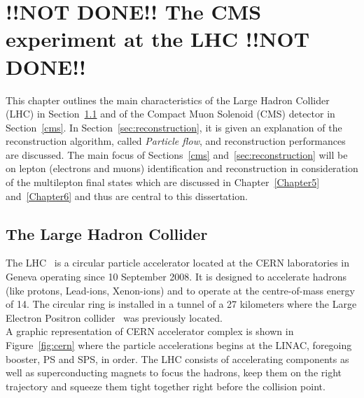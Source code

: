 \chapter{!!NOT DONE!! The CMS experiment at the LHC !!NOT DONE!!} \label{Chapter2} 



This chapter outlines the main characteristics of the Large
Hadron Collider (LHC) in Section~\ref{lhc} and of the Compact Muon Solenoid (CMS)
detector in Section~\ref{cms}. In Section~\ref{sec:reconstruction}, it is
given an explanation of the reconstruction algorithm, called
\emph{Particle flow}, and reconstruction performances are
discussed. The main focus of Sections~\ref{cms}
and~\ref{sec:reconstruction} will be on lepton (electrons and muons) identification and
reconstruction in consideration of the multilepton final states which are
discussed in Chapter~\ref{Chapter5} and~\ref{Chapter6} and thus are
central to this dissertation.



\section{The Large Hadron Collider}\label{lhc}

The LHC~\cite{Brning2004LHCDR} is a circular particle accelerator
located at the CERN laboratories in Geneva operating since 10
September 2008. It is
designed to accelerate hadrons (like protons, Lead-ions, Xenon-ions) and to
operate at the centre-of-mass energy of 14\TeV.
The circular ring is installed in a tunnel of a 27 kilometers where
the Large Electron Positron collider~\cite{Lep:designReport} was
previously located.\\
A graphic representation of CERN accelerator
complex is shown in Figure~\ref{fig:cern} where the particle
accelerations begins at the LINAC, foregoing booster, PS and SPS, in
order. The LHC consists of accelerating components as well as
superconducting magnets to focus the hadrons, keep them on the right
trajectory and squeeze them tight together right before the
collision point. 

